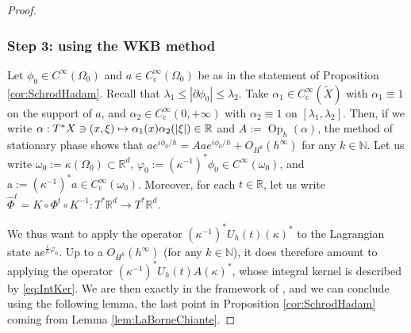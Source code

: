 \documentclass[JEP,XML,SOM,Unicode,published]{cedram}
\newcommand\mto{\mathchoice{\longmapsto}{\mapsto}{\mapsto}{\mapsto}}
\newcommand{\rc}{\mathrm{c}}
\DeclareMathOperator{\Op}{Op}
\theoremstyle{plain}
\theoremstyle{definition}
\newcommand{\N}{\mathbb{N}}
\newcommand{\R}{\mathbb{R}}
\begin{document}
\begin{proof}
\subsubsection*{Step 3: using the WKB method}
Let $\phi_0\in C^\infty(\Omega_0)$ and $a\in C_\rc^\infty(\Omega_0)$ be as in the statement of Proposition \ref{cor:SchrodHadam}. Recall that $\lambda_1\leq |\partial\phi_0|\leq \lambda_2$.
Take $\alpha_1\in C_\rc^\infty(\tilde{X})$ with $\alpha_1\equiv 1$ on the support of $a$, and $\alpha_2\in C_\rc^\infty(0, +\infty)$ with $\alpha_2\equiv 1$ on $[\lambda_1, \lambda_2]$. Then, if we write $\alpha : T^*X\ni (x,\xi) \mto \alpha_1(x) \alpha_2(|\xi|)\in \R$ and $A:= \Op_h (\alpha)$, the method of stationary phase shows that $a e^{i\phi_0/h} = A a e^{i\phi_0/h} + O_{H^k}(h^\infty)$ for any $k\in\N$. Let us write $\omega_0:= \kappa(\Omega_0)\subset \R^d$, $\varphi_0 := (\kappa^{-1})^*\phi_0\in C^\infty(\omega_0)$, and $\mathrm{a} := (\kappa^{-1})^*a\in C_\rc^\infty(\omega_0)$. Moreover, for each $t\in\R$, let us write $\widehat{\Phi}^t=K\circ\Phi^t\circ K^{-1}:T^*\R^d\to T^*\R^d$.

We thus want to apply the operator $(\kappa^{-1})^* U_h(t)(\kappa)^*$ to the Lagrangian state $\mathrm{a} e^{\frac{i}{h}\varphi_0}$. Up to a $O_{H^k}(h^\infty)$ (for any $k\in\N$), it does therefore amount to applying the operator $ (\kappa^{-1})^* U_h(t)A (\kappa)^*$, whose integral kernel is described by \eqref{eq:IntKer}.
We are then exactly in the framework of \cite[Lem.\,4.1]{NZ}, and we can conclude using the following lemma, the last point in Proposition \ref{cor:SchrodHadam} coming from Lemma \ref{lem:LaBorneChiante}.
\end{proof}
\end{document}

